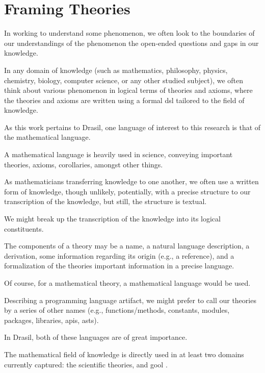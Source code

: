 
\chapter{Framing Theories}
\label{chap:modelkinds}

In working to understand some phenomenon, we often look to the boundaries of our
understandings of the phenomenon \textemdash{} the open-ended questions and gaps in our
knowledge.

In any domain of knowledge (such as mathematics, philosophy, physics, chemistry,
biology, computer science, or any other studied subject), we often think about
various phenomenon in logical terms of theories and axioms, where the theories
and axioms are written using a formal \acs{dsl} tailored to the field of
knowledge.

As this work pertains to Drasil, one language of interest to this research is
that of the mathematical language.

A mathematical language is heavily used in science, conveying important
theories, axioms, corollaries, amongst other things.

As mathematicians transferring knowledge to one another, we often use a written
form of knowledge, though unlikely, potentially, with a precise structure to our
transcription of the knowledge, but still, the structure is textual.

We might break up the transcription of the knowledge into its logical
constituents.

The components of a theory may be a name, a natural language description, a
derivation, some information regarding its origin (e.g., a reference), and a
formalization of the theories important information in a precise language.

Of course, for a mathematical theory, a mathematical language would be used.

Describing a programming language artifact, we might prefer to call our theories
by a series of other names (e.g., functions/methods, constants, modules,
packages, libraries, \acsp{api}, \acsp{ast}).





In Drasil, both of these languages are of great importance.

The mathematical field of knowledge is directly used in at least two domains
currently captured: the scientific theories, and \acs{gool} \cite{Carette2019}.

